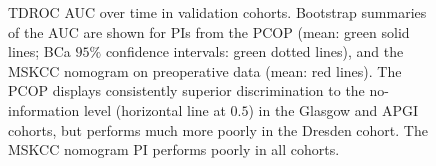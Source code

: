 \documentclass[dissertation.tex]{subfiles}
\begin{document}
\begin{figure}
\centering
\caption[\acrshort{TDROC} \acrshort{AUC} paths for \acrshort{PCOP} in validation data]{\gls{TDROC} \gls{AUC} over time in validation cohorts.  Bootstrap summaries of the \gls{AUC} are shown for \glspl{PI} from the \gls{PCOP} (mean: green solid lines; BCa $95\%$ confidence intervals: green dotted lines), and the \gls{MSKCC} nomogram on preoperative data (mean: red lines).  The \gls{PCOP} displays consistently superior discrimination to the no-information level (horizontal line at $0.5$) in the Glasgow and \gls{APGI} cohorts, but performs much more poorly in the Dresden cohort.  The \gls{MSKCC} nomogram \gls{PI} performs poorly in all cohorts.}
\label{fig:nomo-val-tdroc}
\end{figure}
\end{document}
